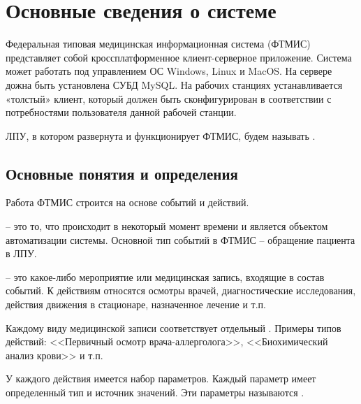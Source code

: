 \newpage
\section{Основные сведения о системе}

Федеральная типовая медицинская информационная система (ФТМИС) представляет собой кроссплатформенное клиент-серверное приложение. Система может работать под управлением ОС Windows, Linux и MacOS. На сервере дожна быть установлена СУБД MySQL. На рабочих станциях устанавливается «толстый» клиент, который должен быть сконфигурирован в соответствии с потребностями пользователя данной рабочей станции.

ЛПУ, в котором развернута и функционирует ФТМИС, будем называть . 

\subsection{Основные понятия и определения}

Работа ФТМИС строится на основе событий и действий.

 – это то, что происходит в некоторый момент времени и является объектом автоматизации системы. Основной тип событий в ФТМИС – обращение пациента в ЛПУ. 

 – это какое-либо мероприятие или медицинская запись, входящие в состав событий. К действиям относятся осмотры врачей, диагностические исследования, действия движения в стационаре, назначенное лечение и т.п. 

Каждому виду медицинской записи соответствует отдельный  . Примеры типов действий: <<Первичный осмотр врача-аллерголога>>, <<Биохимический анализ крови>> и т.п. 

У каждого действия имеется набор параметров. Каждый параметр имеет определенный тип и источник значений. Эти параметры называются .  
